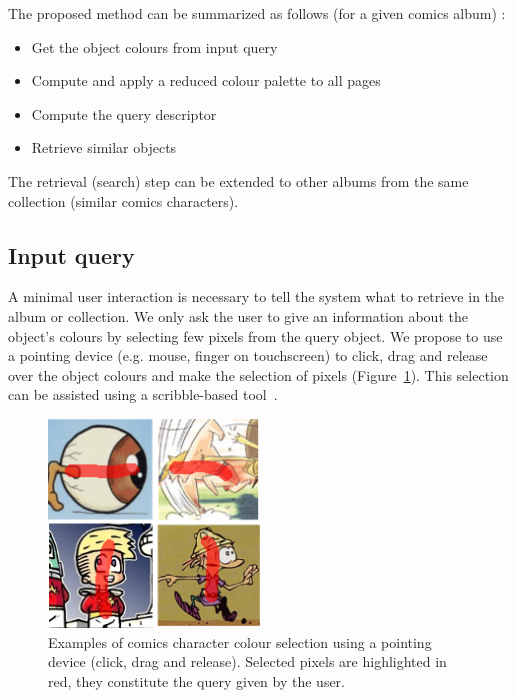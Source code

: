 The proposed method can be summarized as follows (for a given comics album) :
\begin{itemize}
  \item Get the object colours from input query
  \item Compute and apply a reduced colour palette to all pages
  \item Compute the query descriptor
  \item Retrieve similar objects
\end{itemize}

The retrieval (search) step can be extended to other albums from the same collection (similar comics characters).
 

\subsection{Input query}
\label{sec:in:input_query}
A minimal user interaction is necessary to tell the system what to retrieve in the album or collection.
We only ask the user to give an information about the object's colours by selecting few pixels from the query object.
We propose to use a pointing device (e.g. mouse, finger on touchscreen) to click, drag and release over the object colours and make the selection of pixels (Figure~\ref{fig:in:user_selection}).
This selection can be assisted using a scribble-based tool~\cite{Xu2012LazySelection}.

 \begin{figure}[!ht]	%
 	 \centering
 	\includegraphics[width=0.5\textwidth]{user_selection.png}
 	\caption[User defined comics character selection]{Examples of comics character colour selection using a pointing device (click, drag and release). Selected pixels are highlighted in red, they constitute the query given by the user.}
 	\label{fig:in:user_selection}
 \end{figure}


